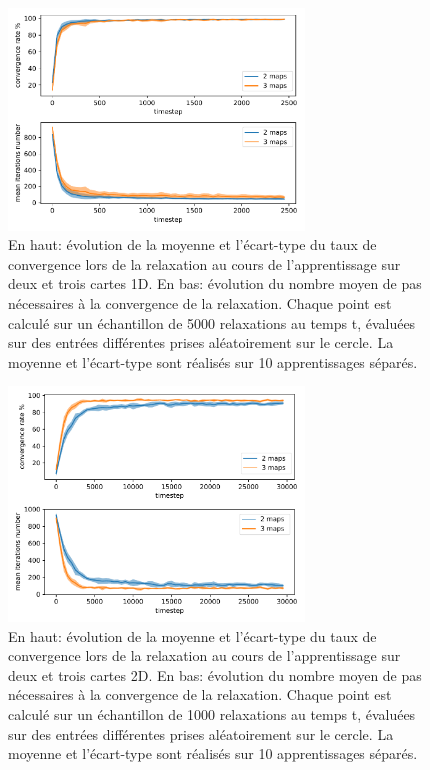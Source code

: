 \documentclass[../main]{subfiles}
\begin{document}
\begin{figure}
	\centering
	\includegraphics[width=0.7\textwidth]{1D_conv_evolution_total.pdf}
	\caption{En haut: évolution de la moyenne et l'écart-type du taux de convergence lors de la relaxation au cours de l'apprentissage sur deux et trois cartes 1D. En bas: évolution du nombre moyen de pas nécessaires à la convergence de la relaxation.
	Chaque point est calculé sur un échantillon de 5000 relaxations au temps t, évaluées sur des entrées différentes prises aléatoirement sur le cercle. La moyenne et l'écart-type sont réalisés sur 10 apprentissages séparés.}
	\label{fig:conv_evolution}
	\end{figure}

\begin{figure}
	\centering
	\includegraphics[width=0.7\textwidth]{2D_conv_evolution_total.pdf}
	\caption{En haut: évolution de la moyenne et l'écart-type du taux de convergence lors de la relaxation au cours de l'apprentissage sur deux et trois cartes 2D. 
	En bas: évolution du nombre moyen de pas nécessaires à la convergence de la relaxation.
	Chaque point est calculé sur un échantillon de 1000 relaxations au temps t, évaluées sur des entrées différentes prises aléatoirement sur le cercle. La moyenne et l'écart-type sont réalisés sur 10 apprentissages séparés.}
	\label{fig:conv_evolution2D}
	\end{figure}
\end{document}
